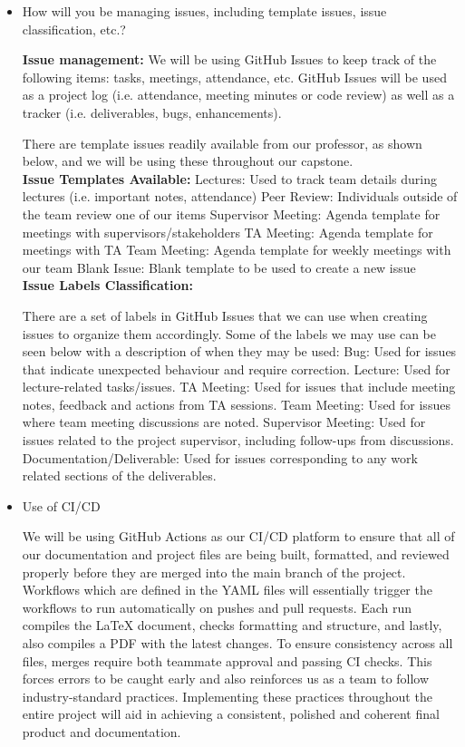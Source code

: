 \documentclass{article}
\begin{document}
\begin{itemize}
 \item How will you be managing issues, including template issues, issue
 classification, etc.?


\textbf{Issue management:}
We will be using GitHub Issues to keep track of the following items: tasks, meetings, attendance, etc. GitHub Issues will be used as a project log (i.e. attendance, meeting minutes or code review) as well as a tracker (i.e. deliverables, bugs, enhancements).


There are template issues readily available from our professor, as shown below, and we will be using these throughout our capstone. \\


\textbf{Issue Templates Available:}
Lectures: Used to track team details during lectures (i.e. important notes, attendance)
Peer Review: Individuals outside of the team review one of our items
Supervisor Meeting: Agenda template for meetings with supervisors/stakeholders
TA Meeting: Agenda template for meetings with TA
Team Meeting: Agenda template for weekly meetings with our team
Blank Issue: Blank template to be used to create a new issue \\


\textbf{Issue Labels Classification:}


There are a set of labels in GitHub Issues that we can use when creating issues to organize them accordingly. Some of the labels we may use can be seen below with a description of when they may be used:
Bug: Used for issues that indicate unexpected behaviour and require correction.
Lecture: Used for lecture-related tasks/issues.
TA Meeting: Used for issues that include meeting notes, feedback and actions from TA sessions.
Team Meeting: Used for issues where team meeting discussions are noted.
Supervisor Meeting: Used for issues related to the project supervisor, including follow-ups from discussions.
Documentation/Deliverable: Used for issues corresponding to any work related sections of the deliverables.


 \item Use of CI/CD


 We will be using GitHub Actions as our CI/CD platform to ensure that all of our documentation and project files are being built,
formatted, and reviewed properly before they are merged into the main branch of the project. Workflows which are defined in the
YAML files will essentially trigger the workflows to run automatically on pushes and pull requests. Each run compiles the LaTeX
document, checks formatting and structure, and lastly, also compiles a PDF with the latest changes. To ensure consistency across
all files, merges require both teammate approval and passing CI checks. This forces errors to be caught early and also reinforces
us as a team to follow industry-standard practices. Implementing these practices throughout the entire project will aid in
achieving a consistent, polished and coherent final product and documentation.


 \end{itemize}
\end{document}
